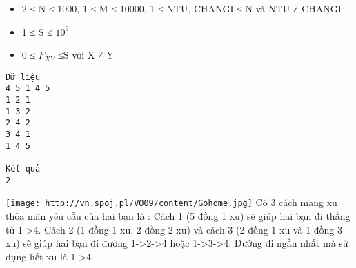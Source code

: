 \begin{itemize}
	\item     2 ≤ N ≤ 1000, 1 ≤ M ≤ 10000, 1 ≤ NTU, CHANGI ≤ N và NTU ≠ CHANGI   
	\item     1 ≤ S ≤ $10^{9}$
	\item     0 ≤ $F_{XY}$    ≤S với X ≠ Y   
\end{itemize}
\begin{verbatim}
Dữ liệu
4 5 1 4 5
1 2 1
1 3 2
2 4 2
3 4 1
1 4 5	

Kết quả
2
\end{verbatim}
\texttt{[image: http://vn.spoj.pl/VO09/content/Gohome.jpg]}
Có 3 cách mang xu thỏa mãn yêu cầu của hai bạn là : Cách 1 (5 đồng 1 xu) sẽ giúp hai bạn đi thẳng từ 1->4. Cách 2 (1 đồng 1 xu, 2 đồng 2 xu) và cách 3 (2 đồng 1 xu và 1 đồng 3 xu) sẽ giúp hai bạn đi đường 1->2->4 hoặc 1->3->4. Đường đi ngắn nhất mà sử dụng hết xu là 1->4.